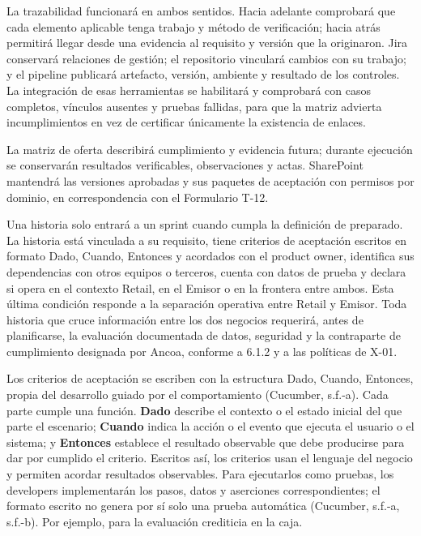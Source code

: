 \documentclass[11pt]{article}
\begin{document}
La trazabilidad funcionará en ambos sentidos. Hacia adelante comprobará
que cada elemento aplicable tenga trabajo y método de verificación;
hacia atrás permitirá llegar desde una evidencia al requisito y versión
que la originaron. Jira conservará relaciones de gestión; el repositorio
vinculará cambios con su trabajo; y el pipeline publicará artefacto,
versión, ambiente y resultado de los controles. La integración de esas
herramientas se habilitará y comprobará con casos completos, vínculos
ausentes y pruebas fallidas, para que la matriz advierta incumplimientos
en vez de certificar únicamente la existencia de enlaces.

La matriz de oferta describirá cumplimiento y evidencia futura; durante
ejecución se conservarán resultados verificables, observaciones y actas.
SharePoint mantendrá las versiones aprobadas y sus paquetes de
aceptación con permisos por dominio, en correspondencia con el
Formulario T-12.

Una historia solo entrará a un sprint cuando cumpla la definición de
preparado. La historia está vinculada a su requisito, tiene criterios de
aceptación escritos en formato Dado, Cuando, Entonces y acordados con el
product owner, identifica sus dependencias con otros equipos o terceros,
cuenta con datos de prueba y declara si opera en el contexto Retail, en
el Emisor o en la frontera entre ambos. Esta última condición responde a
la separación operativa entre Retail y Emisor. Toda historia que cruce
información entre los dos negocios requerirá, antes de planificarse, la
evaluación documentada de datos, seguridad y la contraparte de
cumplimiento designada por Ancoa, conforme a 6.1.2 y a las políticas de
X-01.

Los criterios de aceptación se escriben con la estructura Dado, Cuando,
Entonces, propia del desarrollo guiado por el comportamiento (Cucumber,
s.f.-a). Cada parte cumple una función. \textbf{Dado} describe el
contexto o el estado inicial del que parte el escenario; \textbf{Cuando}
indica la acción o el evento que ejecuta el usuario o el sistema; y
\textbf{Entonces} establece el resultado observable que debe producirse
para dar por cumplido el criterio. Escritos así, los criterios usan el
  lenguaje del negocio y permiten acordar resultados observables. Para
ejecutarlos como pruebas, los developers implementarán los pasos, datos
y aserciones correspondientes; el formato escrito no genera por sí solo
una prueba automática (Cucumber, s.f.-a, s.f.-b). Por ejemplo, para la
evaluación crediticia en la caja.
\end{document}
